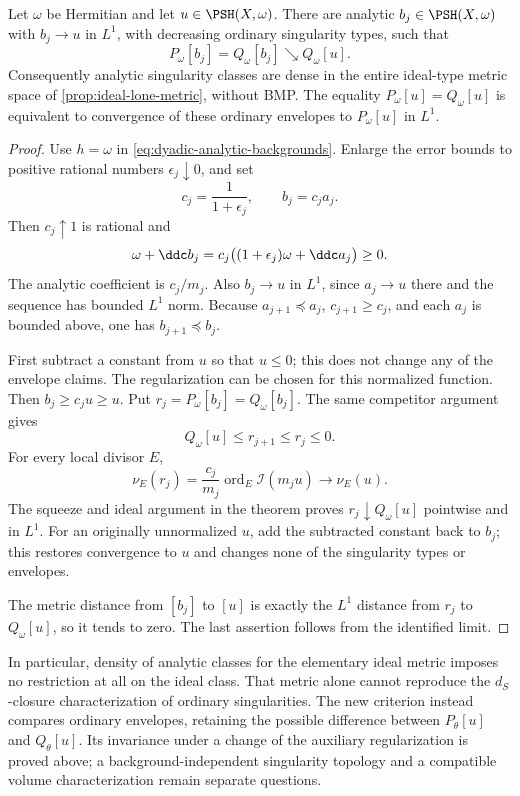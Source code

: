 \begin{corollary}\label{cor:fixed-hermitian-analytic-density}
Let $\omega$ be Hermitian and let $u\in\PSH(X,\omega)$. There are analytic $b_j\in\PSH(X,\omega)$ with $b_j\to u$ in $L^1$, with decreasing ordinary singularity types, such that
\[
 P_\omega[b_j]=Q_\omega[b_j]\searrow Q_\omega[u].
\]
Consequently analytic singularity classes are dense in the entire ideal-type metric space of \cref{prop:ideal-lone-metric}, without BMP. The equality $P_\omega[u]=Q_\omega[u]$ is equivalent to convergence of these ordinary envelopes to $P_\omega[u]$ in $L^1$.
\end{corollary}
\begin{proof}
Use $h=\omega$ in \eqref{eq:dyadic-analytic-backgrounds}. Enlarge the error bounds to positive rational numbers $\epsilon_j\downarrow0$, and set
\[
 c_j=\frac1{1+\epsilon_j},\qquad b_j=c_ja_j.
\]
Then $c_j\uparrow1$ is rational and
\[
 \omega+\ddc b_j
 =c_j\bigl((1+\epsilon_j)\omega+\ddc a_j\bigr)\geq0.
\]
The analytic coefficient is $c_j/m_j$. Also $b_j\to u$ in $L^1$, since $a_j\to u$ there and the sequence has bounded $L^1$ norm. Because $a_{j+1}\preceq a_j$, $c_{j+1}\geq c_j$, and each $a_j$ is bounded above, one has $b_{j+1}\preceq b_j$.

First subtract a constant from $u$ so that $u\leq0$; this does not change any of the envelope claims. The regularization can be chosen for this normalized function. Then $b_j\geq c_ju\geq u$. Put $r_j=P_\omega[b_j]=Q_\omega[b_j]$. The same competitor argument gives
\[
 Q_\omega[u]\leq r_{j+1}\leq r_j\leq0.
\]
For every local divisor $E$,
\[
 \nu_E(r_j)=\frac{c_j}{m_j}
                 \operatorname{ord}_E\mathcal I(m_ju)
                  \longrightarrow\nu_E(u).
\]
The squeeze and ideal argument in the theorem proves $r_j\downarrow Q_\omega[u]$ pointwise and in $L^1$. For an originally unnormalized $u$, add the subtracted constant back to $b_j$; this restores convergence to $u$ and changes none of the singularity types or envelopes.

The metric distance from $[b_j]$ to $[u]$ is exactly the $L^1$ distance from $r_j$ to $Q_\omega[u]$, so it tends to zero. The last assertion follows from the identified limit.
\end{proof}

In particular, density of analytic classes for the elementary ideal metric imposes no restriction at all on the ideal class. That metric alone cannot reproduce the $d_S$-closure characterization of ordinary singularities. The new criterion instead compares ordinary envelopes, retaining the possible difference between $P_\theta[u]$ and $Q_\theta[u]$. Its invariance under a change of the auxiliary regularization is proved above; a background-independent singularity topology and a compatible volume characterization remain separate questions.
